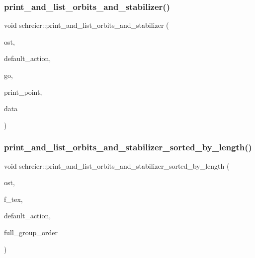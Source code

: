 \subsubsection{\texorpdfstring{print\+\_\+and\+\_\+list\+\_\+orbits\+\_\+and\+\_\+stabilizer()}{print\_and\_list\_orbits\_and\_stabilizer()}}
{\footnotesize\ttfamily void schreier\+::print\+\_\+and\+\_\+list\+\_\+orbits\+\_\+and\+\_\+stabilizer (\begin{DoxyParamCaption}\item[{ostream \&}]{ost,  }\item[{\mbox{\hyperlink{classaction}{action}} $\ast$}]{default\+\_\+action,  }\item[{\mbox{\hyperlink{classlonginteger__object}{longinteger\+\_\+object}} \&}]{go,  }\item[{void($\ast$)(ostream \&ost, \mbox{\hyperlink{galois_8h_a09fddde158a3a20bd2dcadb609de11dc}{I\+NT}} \mbox{\hyperlink{clique__finder_8_c_aec1f1a2b30fdca8844c2932384483145}{pt}}, void $\ast$data)}]{print\+\_\+point,  }\item[{void $\ast$}]{data }\end{DoxyParamCaption})}

\mbox{\label{classschreier_ab8afe2cb22f49ac1baae07143a6bb3fb}} 
\subsubsection{\texorpdfstring{print\+\_\+and\+\_\+list\+\_\+orbits\+\_\+and\+\_\+stabilizer\+\_\+sorted\+\_\+by\+\_\+length()}{print\_and\_list\_orbits\_and\_stabilizer\_sorted\_by\_length()}}
{\footnotesize\ttfamily void schreier\+::print\+\_\+and\+\_\+list\+\_\+orbits\+\_\+and\+\_\+stabilizer\+\_\+sorted\+\_\+by\+\_\+length (\begin{DoxyParamCaption}\item[{ostream \&}]{ost,  }\item[{\mbox{\hyperlink{galois_8h_a09fddde158a3a20bd2dcadb609de11dc}{I\+NT}}}]{f\+\_\+tex,  }\item[{\mbox{\hyperlink{classaction}{action}} $\ast$}]{default\+\_\+action,  }\item[{\mbox{\hyperlink{classlonginteger__object}{longinteger\+\_\+object}} \&}]{full\+\_\+group\+\_\+order }\end{DoxyParamCaption})}

